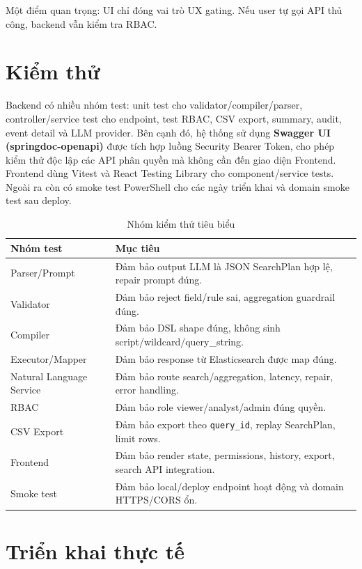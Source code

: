 \documentclass[12pt,a4paper]{report}
\begin{document}
Một điểm quan trọng: UI chỉ đóng vai trò UX gating. Nếu user tự gọi API thủ công, backend vẫn kiểm tra RBAC.

\section{Kiểm thử}

Backend có nhiều nhóm test: unit test cho validator/compiler/parser, controller/service test cho endpoint, test RBAC, CSV export, summary, audit, event detail và LLM provider. Bên cạnh đó, hệ thống sử dụng \textbf{Swagger UI (springdoc-openapi)} được tích hợp luồng Security Bearer Token, cho phép kiểm thử độc lập các API phân quyền mà không cần đến giao diện Frontend. Frontend dùng Vitest và React Testing Library cho component/service tests. Ngoài ra còn có smoke test PowerShell cho các ngày triển khai và domain smoke test sau deploy.

\begin{table}[H]
\centering
\caption{Nhóm kiểm thử tiêu biểu}
\begin{tabular}{p{4cm}p{10cm}}
\toprule
\textbf{Nhóm test} & \textbf{Mục tiêu} \\
\midrule
Parser/Prompt & Đảm bảo output LLM là JSON SearchPlan hợp lệ, repair prompt đúng. \\
Validator & Đảm bảo reject field/rule sai, aggregation guardrail đúng. \\
Compiler & Đảm bảo DSL shape đúng, không sinh script/wildcard/query\_string. \\
Executor/Mapper & Đảm bảo response từ Elasticsearch được map đúng. \\
Natural Language Service & Đảm bảo route search/aggregation, latency, repair, error handling. \\
RBAC & Đảm bảo role viewer/analyst/admin đúng quyền. \\
CSV Export & Đảm bảo export theo \texttt{query\_id}, replay SearchPlan, limit rows. \\
Frontend & Đảm bảo render state, permissions, history, export, search API integration. \\
Smoke test & Đảm bảo local/deploy endpoint hoạt động và domain HTTPS/CORS ổn. \\
\bottomrule
\end{tabular}
\end{table}

\section{Triển khai thực tế}
\end{document}
